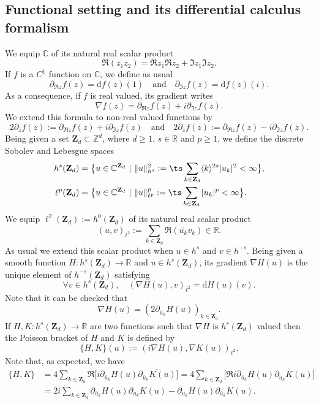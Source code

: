 \subsection{Functional setting and its differential calculus formalism}
We equip $\mathbb{C}$ of its natural real scalar product
\[
\Re (\overline{z_1} z_2) = \Re z_1 \Re z_2 + \Im z_1 \Im z_2.
\]
If $f$ is a $C^1$ function on $\mathbb{C}$, we define as usual
\[
\partial_{\Re z} f(z) = \mathrm{d}f(z)(1) \quad \text{and} \quad \partial_{\Im z} f(z) = \mathrm{d}f(z)(i).
\]
As a consequence, if $f$ is real valued, its gradient writes
\[
\nabla f(z) = \partial_{\Re z} f(z) + i \partial_{\Im z} f(z).
\]
We extend this formula to non-real valued functions by
\[
2 \partial_{\bar{z}} f(z):= \partial_{\Re z} f(z) + i \partial_{\Im z} f(z) \quad \text{and} \quad 2 \partial_{z} f(z):= \partial_{\Re z} f(z) - i \partial_{\Im z} f(z).
\]
Being given a set $\mathbf{Z}_d \subset \mathbb{Z}^d$, where $d\geq 1$, $s\in \mathbb{R}$ and $p\geq 1$, we define the discrete Sobolev and Lebesgue spaces
\begin{align}
\label{eq_def_hs}
h^s(\mathbf{Z}_d)&=\big\{ u\in \mathbb{C}^{\mathbf{Z}_d} \ | \ \|u\|_{h^s}^2:= \ts\sum_{ k \in \mathbf{Z}_d} \langle k \rangle^{2s} |u_k|^2 < \infty \big\},\\
\ell^p(\mathbf{Z}_d)&=\big\{ u\in \mathbb{C}^{\mathbf{Z}_d} \ | \ \|u\|_{\ell^p}^p:= \ts\sum_{ k \in \mathbf{Z}_d} |u_k|^p < \infty \big\}.\notag
\end{align}
We equip $\ell^2(\mathbf{Z}_d):= h^0(\mathbf{Z}_d)$ of its natural real scalar product
\[
(u,v)_{\ell^2}:= \sum_{k\in \mathbf{Z}_d} \Re (\overline{u_k} v_k) \in \mathbb{R}.
\]
As usual we extend this scalar product when $u\in h^s$ and $v\in h^{-s}$.
Being given a smooth function $H: h^s(\mathbf{Z}_d) \to \mathbb{R}$ and $u\in h^s(\mathbf{Z}_d)$, its gradient $\nabla H(u)$ is the unique element of $h^{-s}(\mathbf{Z}_d)$ satisfying
\[
\forall v\in h^{s}(\mathbf{Z}_d), \quad (\nabla H(u),v)_{\ell^2} = \mathrm{d}H(u)(v).
\]
Note that it can be checked that
\[
\nabla H(u) = (2\partial_{\overline{u}_k} H(u))_{k\in \mathbf{Z}_d}.
\]
If $H,K: h^s(\mathbf{Z}_d) \to \mathbb{R}$ are two functions such that $\nabla H$ is $h^{s}(\mathbf{Z}_d)$ valued then the Poisson bracket of $H$ and $K$ is defined by
\[
\{ H,K\}(u):= (i \nabla H(u),\nabla K(u))_{\ell^2}.
\]
Note that, as expected, we have
\begin{equation}\label{eq_poisson_coord}
\begin{split}
\{ H,K\} &= 4 \sum_{k\in \mathbf{Z}_d} \Re \big[i\partial_{\bar{u}_k}H(u) \overline{\partial_{\bar{u}_k} K(u)} \big]= 4 \sum_{k\in \mathbf{Z}_d} \big[\Re i\partial_{\bar{u}_k}H(u) \partial_{u_k} K(u)\big] \\
&=2i \sum_{k\in \mathbf{Z}_d} \partial_{\bar{u}_k}H(u) \partial_{u_k} K(u) - \partial_{u_k}H(u) \partial_{\bar{u}_k} K(u).
\end{split}
\end{equation}
